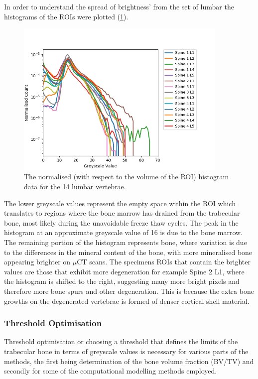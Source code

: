 In order to understand the spread of brightness' from the set of lumbar the
histograms of the ROIs were plotted (\cref{fig:normalisedhistogram}).

\begin{figure}[ht!]
  \centering
 
\includegraphics[width=4in]{Chapters/Chapter_HT_images/Normalised_Histogram.png}
  \caption{The normalised (with respect to the volume of the ROI) histogram
data
    for the 14 lumbar vertebrae.}
  \label{fig:normalisedhistogram}
\end{figure}

The lower greyscale values represent the empty space within the ROI which
translates to regions where the bone marrow has drained from the trabecular
bone, most likely
during the unavoidable freeze thaw cycles. The peak in the histogram at an approximate
greyscale value of 16 is due to the bone marrow. The remaining portion of the
histogram represents bone, where variation is due to the differences in the
mineral content of the bone, with more mineralised bone appearing brighter on
$\mu$CT scans. The specimens ROIs that contain the brighter values are those
that exhibit more degeneration for example Spine 2 L1, where the histogram is
shifted to the right, suggesting many more bright pixels and therefore more
bone spurs and other degeneration. This is because the extra bone growths on
the degenerated vertebrae is formed of denser cortical shell material.

\subsubsection{Threshold Optimisation}\label{th_opt}

Threshold optimisation or choosing a threshold that defines the limits of the
trabecular bone in terms of greyscale values is necessary for various parts of
the methods, the first being determination of the bone volume fraction (BV/TV)
and secondly for some of the computational modelling methods employed.

